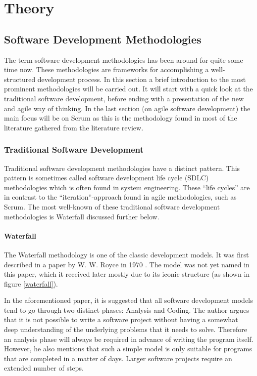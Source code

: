\chapter{Theory}

\minitoc

\newpage

\section{Software Development Methodologies}

The term software development methodologies has been around for quite some time now. These methodologies are frameworks for accomplishing a well-structured development process. In this section a brief introduction to the most prominent methodologies will be carried out. It will start with a quick look at the traditional software development, before ending with a presentation of the new and agile way of thinking. In the last section (on agile software development) the main focus will be on Scrum as this is the methodology found in most of the literature gathered from the literature review.

\subsection{Traditional Software Development}

Traditional software development methodologies have a distinct pattern. This pattern is sometimes called software development life cycle (SDLC) methodologies which is often found in system engineering. These ``life cycles'' are in contrast to the ``iteration''-approach found in agile methodologies, such as Scrum. The most well-known of these traditional software development methodologies is Waterfall discussed further below.

\subsubsection{Waterfall}

The Waterfall methodology is one of the classic development models. It was first described in a paper by W. W. Royce in 1970 \cite{waterfall}.  The model was not yet named in this paper, which it received later mostly due to its iconic structure (as shown in figure \ref{waterfall}).

In the aforementioned paper, it is suggested that all software development models tend to go through two distinct phases: Analysis and Coding. The author argues that it is not possible to write a software project without having a somewhat deep understanding of the underlying problems that it needs to solve. Therefore an analysis phase will always be required in advance of writing the program itself. However, he also mentions that such a simple model is only suitable for programs that are completed in a matter of days. Larger software projects require an extended number of steps.

